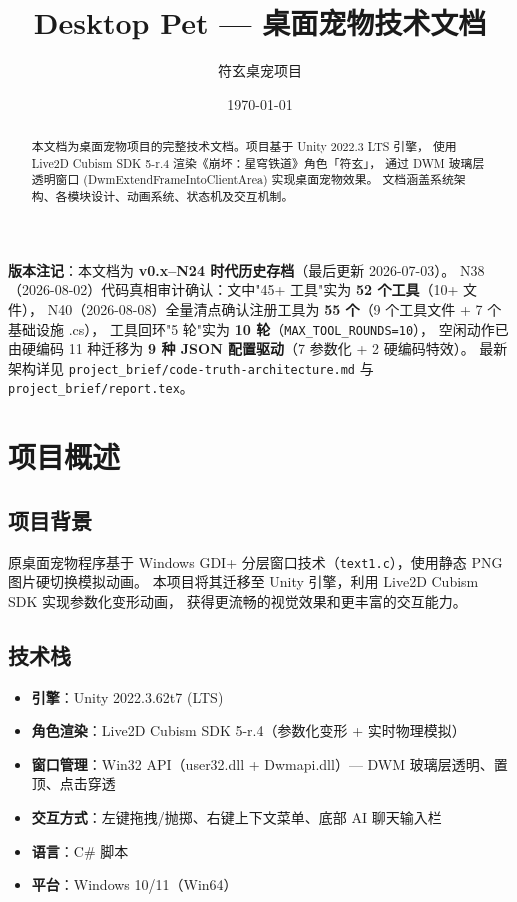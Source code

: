 \documentclass[12pt,a4paper]{ctexart}
\title{\vspace{-2cm}Desktop Pet --- 桌面宠物技术文档}
\author{符玄桌宠项目}
\date{\today}
\begin{document}
\maketitle
\thispagestyle{empty}

\begin{abstract}
本文档为桌面宠物项目的完整技术文档。项目基于 Unity 2022.3 LTS 引擎，
使用 Live2D Cubism SDK 5-r.4 渲染《崩坏：星穹铁道》角色「符玄」，
通过 DWM 玻璃层透明窗口 (DwmExtendFrameIntoClientArea) 实现桌面宠物效果。
文档涵盖系统架构、各模块设计、动画系统、状态机及交互机制。
\end{abstract}

\noindent\textbf{版本注记}：本文档为 \textbf{v0.x--N24 时代历史存档}（最后更新 2026-07-03）。
N38（2026-08-02）代码真相审计确认：文中"45+ 工具"实为 \textbf{52 个工具}（10+ 文件），
N40（2026-08-08）全量清点确认注册工具为 \textbf{55 个}（9 个工具文件 + 7 个基础设施 .cs），
工具回环"5 轮"实为 \textbf{10 轮}（\texttt{MAX\_TOOL\_ROUNDS=10}），
空闲动作已由硬编码 11 种迁移为 \textbf{9 种 JSON 配置驱动}（7 参数化 + 2 硬编码特效）。
最新架构详见 \texttt{project\_brief/code-truth-architecture.md} 与 \texttt{project\_brief/report.tex}。

\tableofcontents
\newpage

\section{项目概述}

\subsection{项目背景}

原桌面宠物程序基于 Windows GDI+ 分层窗口技术（\texttt{text1.c}），使用静态 PNG 图片硬切换模拟动画。
本项目将其迁移至 Unity 引擎，利用 Live2D Cubism SDK 实现参数化变形动画，
获得更流畅的视觉效果和更丰富的交互能力。

\subsection{技术栈}

\begin{itemize}
    \item \textbf{引擎}：Unity 2022.3.62t7 (LTS)
    \item \textbf{角色渲染}：Live2D Cubism SDK 5-r.4（参数化变形 + 实时物理模拟）
    \item \textbf{窗口管理}：Win32 API（user32.dll + Dwmapi.dll）--- DWM 玻璃层透明、置顶、点击穿透
    \item \textbf{交互方式}：左键拖拽/抛掷、右键上下文菜单、底部 AI 聊天输入栏
    \item \textbf{语言}：C\# 脚本
    \item \textbf{平台}：Windows 10/11（Win64）
\end{itemize}
\end{document}
